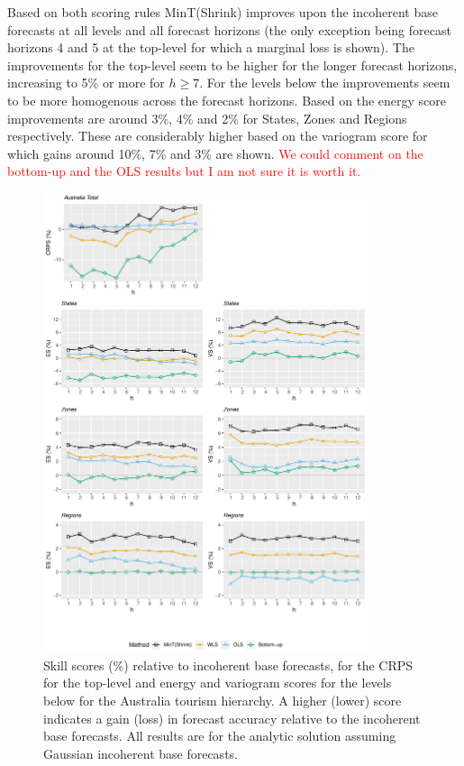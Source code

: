 \documentclass[12pt]{article}
\theoremstyle{definition}
\begin{document}
Based on both scoring rules MinT(Shrink) improves upon the incoherent base forecasts at all levels and all forecast horizons (the only exception being forecast horizons 4 and 5 at the top-level for which a marginal loss is shown). The improvements for the top-level seem to be higher for the longer forecast horizons, increasing to 5\% or more for $h\ge7$. For the levels below the improvements seem to be more homogenous across the forecast horizons. Based on the energy score improvements are around 3\%, 4\% and 2\% for States, Zones and Regions respectively. These are considerably higher based on the variogram score for which gains around 10\%, 7\% and 3\% are shown. \textcolor{red}{We could comment on the bottom-up and the OLS results but I am not sure it is worth it.}

\begin{figure}
	\centering
	\small
	\includegraphics[width= 0.85\textwidth, height= 0.85\textheight]{Empirical-results/Results-ARIMA/SkillScore_Gauss_Levels.pdf}
	\caption{Skill scores (\%) relative to incoherent base forecasts, for the CRPS for the top-level and energy and variogram scores for the levels below for the Australia tourism hierarchy. A higher (lower) score indicates a gain (loss) in forecast accuracy relative to the incoherent base forecasts. All results are for the analytic solution assuming Gaussian incoherent base forecasts.} \label{fig:ES-SS-Levels}
\end{figure}
\end{document}
